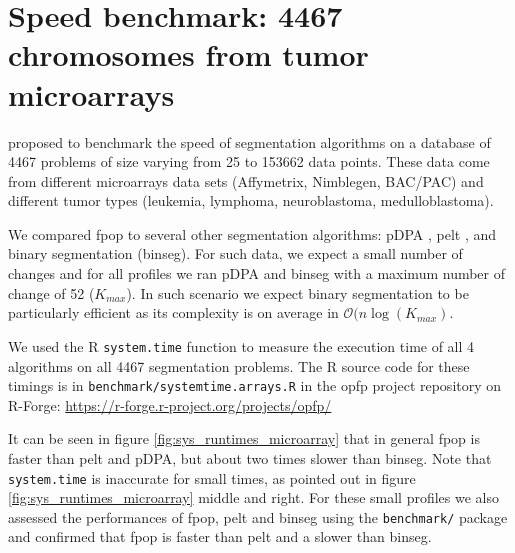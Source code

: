 \documentclass{article}
\begin{document}
\section{Speed benchmark: 4467 chromosomes from 
  tumor microarrays}

\citet{HOCKING-SegAnnDB} proposed to benchmark the speed of 
segmentation algorithms on a database of 4467 problems of size varying
from 25 to 153662 data points. These data come from different
microarrays data sets (Affymetrix, Nimblegen, BAC/PAC) and different
tumor types (leukemia, lymphoma, neuroblastoma, medulloblastoma).

We compared fpop to several other segmentation algorithms: pDPA
\citep{pruned-dp}, pelt \citep{pelt}, and binary segmentation
(binseg). 
For such data, we expect a small number of changes and for all profiles we ran 
pDPA and binseg with a maximum number of change of 52 ($K_{max}$). 
In such scenario we expect binary segmentation to be particularly efficient as its complexity
is on average in $\mathcal{O}(n\log(K_{max})$.

We used the R \verb|system.time| function to measure
the execution time of all 4 algorithms on all 4467 segmentation
problems. The R source code for these timings is in
\verb|benchmark/systemtime.arrays.R| in the opfp project repository on
R-Forge:
\url{https://r-forge.r-project.org/projects/opfp/}


It can be seen in figure \ref{fig:sys_runtimes_microarray} that in general fpop is faster than pelt
and pDPA, but about two times slower than binseg. 
Note that \verb|system.time| is inaccurate for small times, as pointed out in figure \ref{fig:sys_runtimes_microarray} middle and right. 
For these small profiles we also assessed the performances of fpop, pelt and binseg using the \verb|benchmark/| package
and confirmed that fpop is faster than pelt and a slower than binseg.
 
\end{document}
